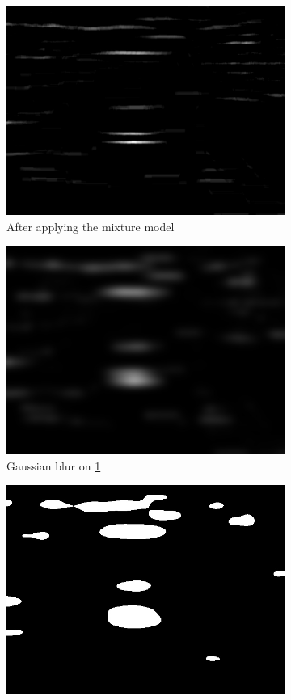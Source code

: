 \documentclass{standalone}
\begin{document}
\begin{figure}
\begin{subfigure}{.5\textwidth}
  \centering
  \includegraphics[width=.8\linewidth]{./img/sample/stage5-4.jpg}
  \caption{After applying the mixture model}
  \label{fig:OriginalMixtureModel}
\end{subfigure}
\begin{subfigure}{.5\textwidth}
  \centering
  \includegraphics[width=.8\linewidth]{./img/sample/stage5-3.jpg}
  \caption{Gaussian blur on \ref{fig:OriginalMixtureModel}}
  \label{fig:BlurredMixtureModel}
\end{subfigure}
\begin{subfigure}{.5\textwidth}
  \centering
  \includegraphics[width=.8\linewidth]{./img/sample/stage5-1.jpg}

\end{subfigure}
\end{figure}
\end{document}
